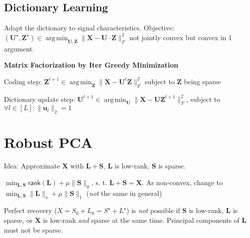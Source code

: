 \documentclass[a4paper, 11pt, landscape]{article}
\DeclareMathOperator*{\argmin}{arg\,min}
\begin{document}
\begin{multicols*}{3}

    \subsection{Dictionary Learning}
    Adapt the dictionary to signal characteristics. Objective: $(\mathbf{U}^\star, \mathbf{Z}^\star) \in \argmin_\mathbf{U,Z} \| \mathbf{X} - \mathbf{U} \cdot \mathbf{Z} \|_F^2$ not jointly convex but convex in 1 argument.

    \textbf{Matrix Factorization by Iter Greedy Minimization}
    \begin{inparaenum}
    \item Coding step: $\mathbf{Z}^{t+1} \in \argmin_\mathbf{Z} \| \mathbf{X} - \mathbf{U}^t \mathbf{Z} \|_F^2$ subject to $\mathbf{Z}$ being sparse
    \item Dictionary update step: $\mathbf{U}^{t+1} \in \argmin_\mathbf{U} \| \mathbf{X} - \mathbf{UZ}^{t+1} \|_F^2$, subject to $\forall l\in [L]:\|\mathbf{u}_l\|_2 = 1$
    \end{inparaenum}

    \section{Robust PCA}
    \begin{compactitem}
    \item Idea: Approximate $\mathbf{X}$ with $\mathbf{L} + \mathbf{S}$, $\mathbf{L}$ is low-rank, $\mathbf{S}$ is sparse.
    \item $\min_{\mathbf{L},\mathbf{S}}\mathsf{rank}(\mathbf{L}) + \mu \lVert \mathbf{S}\rVert_0$, s. t. $\mathbf{L} + \mathbf{S} = \mathbf{X}$. 
        As non-convex, change to $\min_{\mathbf{L},\mathbf{S}} \|\mathbf{L}\|_\star + \mu \lVert\mathbf{S}\rVert_1$ (\emph{not} the same in general)
    \item Perfect recovery ($X = S_0 + L_0 = S^\star + L^\star$) is \emph{not} possible if $\mathbf{S}$ is low-rank, 
        $\mathbf{L}$ is sparse, or $\mathbf{X}$ is low-rank \textit{and} sparse at the same time. Principal components of $\mathbf{L}$ must not be sparse.
    \end{compactitem}


\end{multicols*}
\end{document}
